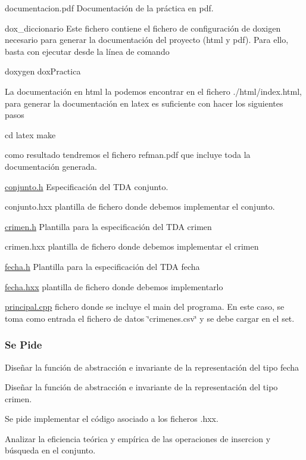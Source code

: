 \begin{DoxyItemize}
\item documentacion.\+pdf Documentación de la práctica en pdf. \item dox\+\_\+diccionario Este fichero contiene el fichero de configuración de doxigen necesario para generar la documentación del proyecto (html y pdf). Para ello, basta con ejecutar desde la línea de comando 
\begin{DoxyCode}
doxygen doxPractica
\end{DoxyCode}
 La documentación en html la podemos encontrar en el fichero ./html/index.html, para generar la documentación en latex es suficiente con hacer los siguientes pasos 
\begin{DoxyCode}
cd latex
make
\end{DoxyCode}
 como resultado tendremos el fichero refman.\+pdf que incluye toda la documentación generada.\end{DoxyItemize}
\begin{DoxyItemize}
\item \hyperlink{conjunto_8h}{conjunto.\+h} Especificación del T\+D\+A conjunto. \item conjunto.\+hxx plantilla de fichero donde debemos implementar el conjunto. \item \hyperlink{crimen_8h}{crimen.\+h} Plantilla para la especificación del T\+D\+A crimen \item crimen.\+hxx plantilla de fichero donde debemos implementar el crimen \item \hyperlink{fecha_8h}{fecha.\+h} Plantilla para la especificación del T\+D\+A fecha \item \hyperlink{fecha_8hxx}{fecha.\+hxx} plantilla de fichero donde debemos implementarlo\end{DoxyItemize}
\begin{DoxyItemize}
\item \hyperlink{principal_8cpp}{principal.\+cpp} fichero donde se incluye el main del programa. En este caso, se toma como entrada el fichero de datos \char`\"{}crimenes.\+csv\char`\"{} y se debe cargar en el set.\end{DoxyItemize}
\hypertarget{index_ssPide}{}\subsubsection{Se Pide}\label{index_ssPide}
\begin{DoxyItemize}
\item Diseñar la función de abstracción e invariante de la representación del tipo fecha \item Diseñar la función de abstracción e invariante de la representación del tipo crimen. \item Se pide implementar el código asociado a los ficheros .hxx. \item Analizar la eficiencia teórica y empírica de las operaciones de insercion y búsqueda en el conjunto.\end{DoxyItemize}
